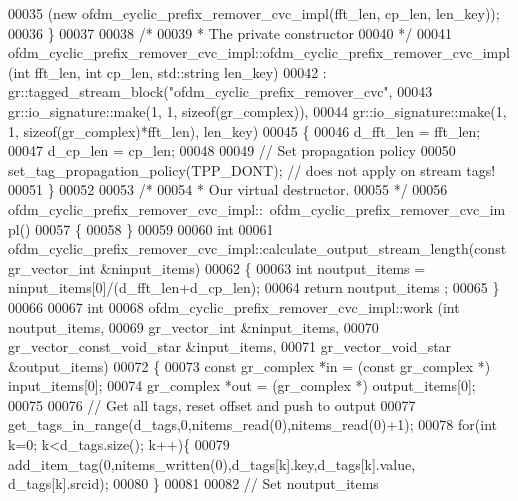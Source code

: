 \begin{DoxyCode}
00035         (\textcolor{keyword}{new} ofdm_cyclic_prefix_remover_cvc_impl(fft\_len, cp\_len, len\_key));
00036     \}
00037 
00038     \textcolor{comment}{/*}
00039 \textcolor{comment}{     * The private constructor}
00040 \textcolor{comment}{     */}
00041     ofdm_cyclic_prefix_remover_cvc_impl::ofdm_cyclic_prefix_remover_cvc_impl(\textcolor{keywordtype}{int} fft\_len, \textcolor{keywordtype}{int} cp\_len, 
      std::string len\_key)
00042       : gr::tagged\_stream\_block(\textcolor{stringliteral}{"ofdm\_cyclic\_prefix\_remover\_cvc"},
00043               gr::io\_signature::make(1, 1, sizeof(gr\_complex)),
00044               gr::io\_signature::make(1, 1, sizeof(gr\_complex)*fft\_len), len\_key)
00045     \{
00046         d_fft_len = fft\_len;
00047         d_cp_len = cp\_len;
00048         
00049         \textcolor{comment}{// Set propagation policy}
00050         set\_tag\_propagation\_policy(TPP\_DONT); \textcolor{comment}{// does not apply on stream tags!}
00051     \}
00052 
00053     \textcolor{comment}{/*}
00054 \textcolor{comment}{     * Our virtual destructor.}
00055 \textcolor{comment}{     */}
00056     ofdm_cyclic_prefix_remover_cvc_impl::~ofdm_cyclic_prefix_remover_cvc_impl()
00057     \{
00058     \}
00059 
00060     \textcolor{keywordtype}{int}
00061     ofdm_cyclic_prefix_remover_cvc_impl::calculate_output_stream_length(\textcolor{keyword}{const} gr\_vector\_int &ninput\_items)
00062     \{
00063       \textcolor{keywordtype}{int} noutput\_items = ninput\_items[0]/(d_fft_len+d_cp_len);
00064       \textcolor{keywordflow}{return} noutput\_items ;
00065     \}
00066 
00067     \textcolor{keywordtype}{int}
00068     ofdm_cyclic_prefix_remover_cvc_impl::work (\textcolor{keywordtype}{int} noutput\_items,
00069                        gr\_vector\_int &ninput\_items,
00070                        gr\_vector\_const\_void\_star &input\_items,
00071                        gr\_vector\_void\_star &output\_items)
00072     \{
00073         \textcolor{keyword}{const} gr\_complex *in = (\textcolor{keyword}{const} gr\_complex *) input\_items[0];
00074         gr\_complex *out = (gr\_complex *) output\_items[0];
00075 
00076         \textcolor{comment}{// Get all tags, reset offset and push to output}
00077         get\_tags\_in\_range(d_tags,0,nitems\_read(0),nitems\_read(0)+1);
00078         \textcolor{keywordflow}{for}(\textcolor{keywordtype}{int} k=0; k<d_tags.size(); k++)\{
00079             add\_item\_tag(0,nitems\_written(0),d_tags[k].key,d_tags[k].value,
      d_tags[k].srcid);
00080         \}
00081         
00082         \textcolor{comment}{// Set noutput\_items}

\end{DoxyCode}

